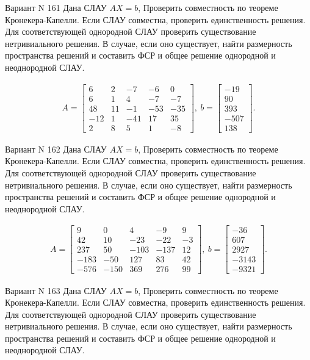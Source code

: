 \documentclass[11pt]{report}
\begin{document}
Вариант N 161
Дана СЛАУ $AX = b$,
Проверить совместность по теореме Кронекера-Капелли. Если СЛАУ совместна, проверить единственность решения.
Для соответствующей однородной СЛАУ проверить существование нетривиального решения. В случае, если оно существует,
найти размерность пространства решений и составить ФСР и общее решение однородной  и неоднородной СЛАУ.


\begin{align*}
 A = \left[\begin{matrix}6 & 2 & -7 & -6 & 0\\6 & 1 & 4 & -7 & -7\\48 & 11 & -1 & -53 & -35\\-12 & 1 & -41 & 17 & 35\\2 & 8 & 5 & 1 & -8\end{matrix}\right],
\ b = \left[\begin{matrix}-19\\90\\393\\-507\\138\end{matrix}\right]. 
 \end{align*}

Вариант N 162
Дана СЛАУ $AX = b$,
Проверить совместность по теореме Кронекера-Капелли. Если СЛАУ совместна, проверить единственность решения.
Для соответствующей однородной СЛАУ проверить существование нетривиального решения. В случае, если оно существует,
найти размерность пространства решений и составить ФСР и общее решение однородной  и неоднородной СЛАУ.


\begin{align*}
 A = \left[\begin{matrix}9 & 0 & 4 & -9 & 9\\42 & 10 & -23 & -22 & -3\\237 & 50 & -103 & -137 & 12\\-183 & -50 & 127 & 83 & 42\\-576 & -150 & 369 & 276 & 99\end{matrix}\right],
\ b = \left[\begin{matrix}-36\\607\\2927\\-3143\\-9321\end{matrix}\right]. 
 \end{align*}

Вариант N 163
Дана СЛАУ $AX = b$,
Проверить совместность по теореме Кронекера-Капелли. Если СЛАУ совместна, проверить единственность решения.
Для соответствующей однородной СЛАУ проверить существование нетривиального решения. В случае, если оно существует,
найти размерность пространства решений и составить ФСР и общее решение однородной  и неоднородной СЛАУ.
\end{document}
